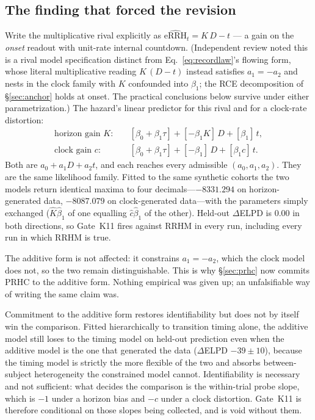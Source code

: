 \documentclass[9pt,twocolumn]{article}
\newcommand{\eRRHhat}{\widehat{\mathrm{eRRH}}}
\begin{document}
\subsection{The finding that forced the revision}
Write the multiplicative rival explicitly as $\eRRHhat_t=K\,D-t$ --- a gain on the \emph{onset} readout with unit-rate internal countdown. (Independent review noted this is a rival model specification distinct from Eq.~\ref{eq:recordlaw}'s flowing form, whose literal multiplicative reading $K\,(D-t)$ instead satisfies $a_1=-a_2$ and nests in the clock family with $K$ confounded into $\beta_1$; the RCE decomposition of \S\ref{sec:anchor} holds at onset. The practical conclusions below survive under either parametrization.) The hazard's linear predictor for this rival and for a clock-rate distortion:
\begin{align*}
\text{horizon gain } K:&\quad [\beta_0+\beta_1\tau] + [-\beta_1 K]\,D + [\beta_1]\,t,\\
\text{clock gain } c:&\quad [\beta_0+\beta_1\tau] + [-\beta_1]\,D + [\beta_1 c]\,t.
\end{align*}
Both are $a_0+a_1D+a_2t$, and each reaches every admissible $(a_0,a_1,a_2)$. They are the same likelihood family. Fitted to the same synthetic cohorts the two models return identical maxima to four decimals---$-8331.294$ on horizon-generated data, $-8087.079$ on clock-generated data---with the parameters simply exchanged ($\hat K\hat\beta_1$ of one equalling $\hat c\hat\beta_1$ of the other). Held-out $\Delta$ELPD is $0.00$ in both directions, so Gate~K11 fires against RRHM in every run, including every run in which RRHM is true.

The additive form is not affected: it constrains $a_1=-a_2$, which the clock model does not, so the two remain distinguishable. This is why \S\ref{sec:prhc} now commits PRHC to the additive form. Nothing empirical was given up; an unfalsifiable way of writing the same claim was.

Commitment to the additive form restores identifiability but does not by itself win the comparison. Fitted hierarchically to transition timing alone, the additive model still loses to the timing model on held-out prediction even when the additive model is the one that generated the data ($\Delta$ELPD $-39\pm10$), because the timing model is strictly the more flexible of the two and absorbs between-subject heterogeneity the constrained model cannot. Identifiability is necessary and not sufficient: what decides the comparison is the within-trial probe slope, which is $-1$ under a horizon bias and $-c$ under a clock distortion. Gate~K11 is therefore conditional on those slopes being collected, and is void without them.
\end{document}
